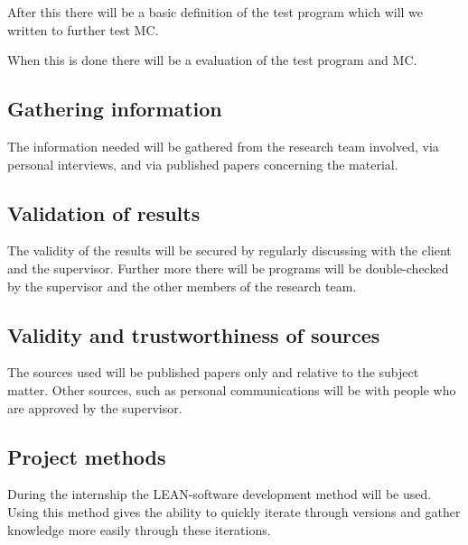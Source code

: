 After this there will be a basic definition of the test program which will we written to further test MC.

When this is done there will be a evaluation of the test program and MC.

\subsection{Gathering information}
The information needed will be gathered from the research team involved, via personal interviews, and via published papers concerning the material.

\subsection{Validation of results}
The validity of the results will be secured by regularly discussing with the client and the supervisor.
Further more there will be programs will be double-checked by the supervisor and the other members of the research team.

\subsection{Validity and trustworthiness of sources}
The sources used will be published papers only and relative to the subject matter.
Other sources, such as personal communications will be with people who are approved by the supervisor.

\subsection{Project methods}
During the internship the LEAN-software development method will be used\cite{ries2011lean}.
Using this method gives the ability to quickly iterate through versions and gather knowledge more easily through these iterations.

